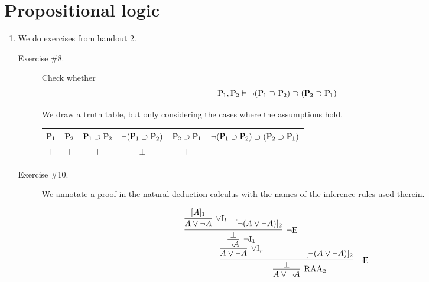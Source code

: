 \documentclass[11pt,letterpaper]{article}
\renewcommand{\implies}{\supset}
\begin{document}
\section{Propositional logic}

\begin{enumerate}
  \item
    We do exercises from handout 2.

    \begin{description}
      \item[Exercise \#8.]
        Check whether
        \begin{equation*}
          \mathqd{P}_1, \mathqd{P}_2
          \entails
          \neg(\mathqd{P}_1 \implies \mathqd{P}_2)
          \implies
          (\mathqd{P}_2 \implies \mathqd{P}_1)
        \end{equation*}

        We draw a truth table, but only considering the cases where the
        assumptions hold.

        \begin{center}
          \begin{tabular}{cc|cccc}
            $\mathqd{P}_1$ &
            $\mathqd{P}_2$ &
            $\mathqd{P}_1 \implies \mathqd{P}_2$ &
            $\neg(\mathqd{P}_1 \implies \mathqd{P}_2)$ &
            $\mathqd{P}_2 \implies \mathqd{P}_1$ &
            $\neg(\mathqd{P}_1 \implies \mathqd{P}_2)
            \implies
            (\mathqd{P}_2 \implies \mathqd{P}_1)$ \\
            \hline
            $\top$ & $\top$ & $\top$ & $\bot$ & $\top$ & $\top$
          \end{tabular}
        \end{center}

      \item[Exercise \#10.]
        We annotate a proof in the natural deduction calculus with the names of
        the inference rules used therein.

        \begin{equation*}
          \infer[\text{RAA}_2]{
            A \lor \neg A
          }{
            \infer[\neg \text{E}]{
              \bot
            }{
              \infer[\lor \text{I}_r]{
                A \lor \neg A
              }{
                \infer[\neg \text{I}_1]{
                  \neg A
                }{
                  \infer[\neg \text{E}]{
                    \bot
                  }{
                    \infer[\lor \text{I}_l]{
                      A \lor \neg A
                    }{
                      [A]_1
                    }
                    &
                    [\neg (A \lor \neg A)]_2
                  }
                }
              }
              &
              [\neg(A \lor \neg A)]_2
            }
          }
        \end{equation*}


\end{description}
\end{enumerate}
\end{document}
